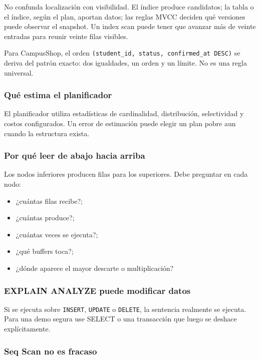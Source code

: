 \documentclass[variant=docente,cover=institutional,mode=screen]{ua-engineering-v6-article}
\begin{document}
No confunda localización con visibilidad. El índice produce candidatos; la tabla o el índice, según el plan, aportan datos; las reglas MVCC deciden qué versiones puede observar el snapshot. Un index scan puede tener que avanzar más de veinte entradas para reunir veinte filas visibles.

Para CampusShop, el orden \texttt{(student\_id, status, confirmed\_at DESC)} se deriva del patrón exacto: dos igualdades, un orden y un límite. No es una regla universal.

\subsubsection*{Qué estima el planificador}

El planificador utiliza estadísticas de cardinalidad, distribución, selectividad y costos configurados. Un error de estimación puede elegir un plan pobre aun cuando la estructura exista.

\subsubsection*{Por qué leer de abajo hacia arriba}

Los nodos inferiores producen filas para los superiores. Debe preguntar en cada nodo:

\begin{itemize}
\item ¿cuántas filas recibe?;
\item ¿cuántas produce?;
\item ¿cuántas veces se ejecuta?;
\item ¿qué buffers toca?;
\item ¿dónde aparece el mayor descarte o multiplicación?
\end{itemize}

\subsubsection*{EXPLAIN ANALYZE puede modificar datos}

Si se ejecuta sobre \texttt{INSERT}, \texttt{UPDATE} o \texttt{DELETE}, la sentencia realmente se ejecuta. Para una demo segura use SELECT o una transacción que luego se deshace explícitamente.

\subsubsection*{Seq Scan no es fracaso}
\end{document}

